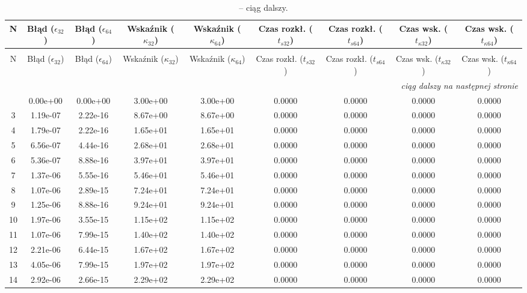 \begin{longtable}{ccccccccc}
\caption{Wyniki dla macierzy $A_{II}$ \label{tab:table_A_II}} \\
\toprule
N & Błąd ($\epsilon_{32}$) & Błąd ($\epsilon_{64}$) & Wskaźnik ($\kappa_{32}$) & Wskaźnik ($\kappa_{64}$) & Czas rozkł. ($t_{s32}$) & Czas rozkł. ($t_{s64}$) & Czas wsk. ($t_{\kappa32}$) & Czas wsk. ($t_{\kappa64}$) \\
\midrule
\endfirsthead
\caption[]{-- ciąg dalszy.} \\
\toprule
N & Błąd ($\epsilon_{32}$) & Błąd ($\epsilon_{64}$) & Wskaźnik ($\kappa_{32}$) & Wskaźnik ($\kappa_{64}$) & Czas rozkł. ($t_{s32}$) & Czas rozkł. ($t_{s64}$) & Czas wsk. ($t_{\kappa32}$) & Czas wsk. ($t_{\kappa64}$) \\
\midrule
\endhead
\midrule
\multicolumn{9}{r}{\textit{ciąg dalszy na następnej stronie}} \\
\endfoot
\bottomrule
\endlastfoot
2 & 0.00e+00 & 0.00e+00 & 3.00e+00 & 3.00e+00 & 0.0000 & 0.0000 & 0.0000 & 0.0000 \\
3 & 1.19e-07 & 2.22e-16 & 8.67e+00 & 8.67e+00 & 0.0000 & 0.0000 & 0.0000 & 0.0000 \\
4 & 1.79e-07 & 2.22e-16 & 1.65e+01 & 1.65e+01 & 0.0000 & 0.0000 & 0.0000 & 0.0000 \\
5 & 6.56e-07 & 4.44e-16 & 2.68e+01 & 2.68e+01 & 0.0000 & 0.0000 & 0.0000 & 0.0000 \\
6 & 5.36e-07 & 8.88e-16 & 3.97e+01 & 3.97e+01 & 0.0000 & 0.0000 & 0.0000 & 0.0000 \\
7 & 1.37e-06 & 5.55e-16 & 5.46e+01 & 5.46e+01 & 0.0000 & 0.0000 & 0.0000 & 0.0000 \\
8 & 1.07e-06 & 2.89e-15 & 7.24e+01 & 7.24e+01 & 0.0000 & 0.0000 & 0.0000 & 0.0000 \\
9 & 1.25e-06 & 8.88e-16 & 9.24e+01 & 9.24e+01 & 0.0000 & 0.0000 & 0.0000 & 0.0000 \\
10 & 1.97e-06 & 3.55e-15 & 1.15e+02 & 1.15e+02 & 0.0000 & 0.0000 & 0.0000 & 0.0000 \\
11 & 1.07e-06 & 7.99e-15 & 1.40e+02 & 1.40e+02 & 0.0000 & 0.0000 & 0.0000 & 0.0000 \\
12 & 2.21e-06 & 6.44e-15 & 1.67e+02 & 1.67e+02 & 0.0000 & 0.0000 & 0.0000 & 0.0000 \\
13 & 4.05e-06 & 7.99e-15 & 1.97e+02 & 1.97e+02 & 0.0000 & 0.0000 & 0.0000 & 0.0000 \\
14 & 2.92e-06 & 2.66e-15 & 2.29e+02 & 2.29e+02 & 0.0000 & 0.0000 & 0.0000 & 0.0000 \\

\end{longtable}
